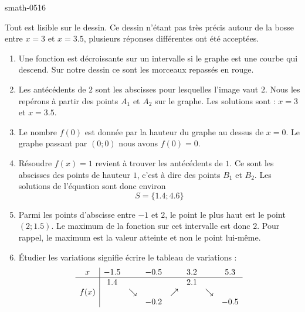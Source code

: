 
\begin{corrige}{smath-0516}


    Tout est lisible sur le dessin. Ce dessin n'étant pas très précis autour de la bosse entre \( x=3\) et \( x=3.5\), plusieurs réponses différentes ont été acceptées.

    \begin{center}
   
    \end{center}

    \begin{enumerate}
        \item
            Une fonction est décroissante sur un intervalle si le graphe est une courbe qui descend. Sur notre dessin ce sont les morceaux repassés en rouge.
        \item
            Les antécédents de \( 2\) sont les abscisses pour lesquelles l'image vaut \( 2\). Nous les repérons à partir des points \( A_1\) et \( A_2\) sur le graphe. Les solutions sont : \( x=3\) et \( x=3.5\). 

        \item

            Le nombre \( f(0)\) est donnée par la hauteur du graphe au dessus de \( x=0\). Le graphe passant par \( (0;0)\) nous avons \( f(0)=0\).
        \item
            Résoudre \( f(x)=1\) revient à trouver les antécédents de \( 1\). Ce sont les abscisses des points de hauteur \( 1\), c'est à dire des points \( B_1\) et \( B_2\). Les solutions de l'équation sont donc environ
            \begin{equation}
                S=\{ 1.4;4.6 \}
            \end{equation}
        \item
            Parmi les points d'abscisse entre \( -1\) et \( 2\), le point le plus haut est le point \( (2;1.5)\). Le maximum de la fonction sur cet intervalle est donc \( 2\). Pour rappel, le maximum est la valeur atteinte et non le point lui-même.
        \item
            Étudier les variations signifie écrire le tableau de variations :
            \begin{equation*}
                \begin{array}[]{c|ccccccc}
                    x&-1.5&&-0.5&&3.2&&5.3\\
                    \hline
                    &1.4&&&&2.1&&\\
                    f(x)&&\searrow&&\nearrow&&\searrow&\\
                    &&&-0.2&&&&-0.5\\
                \end{array}
            \end{equation*}
    \end{enumerate}

\end{corrige}
